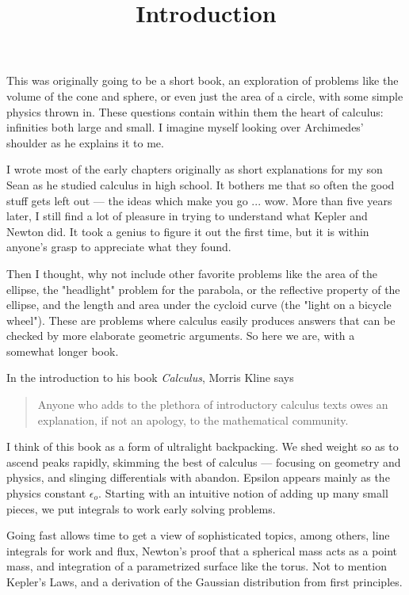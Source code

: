 \documentclass[11pt, oneside]{article}
\title{Introduction}
\date{}
\begin{document}
\maketitle
\Large
This was originally going to be a short book, an exploration of problems like the volume of the cone and sphere, or even just the area of a circle, with some simple physics thrown in.  These questions contain within them the heart of calculus:  infinities both large and small.  I imagine myself looking over Archimedes' shoulder as he explains it to me.

I wrote most of the early chapters originally as short explanations for my son Sean as he studied calculus in high school.  It bothers me that so often the good stuff gets left out --- the ideas which make you go ... wow.  More than five years later, I still find a lot of pleasure in trying to understand what Kepler and Newton did.  It took a genius to figure it out the first time, but it is within anyone's grasp to appreciate what they found.

Then I thought, why not include other favorite problems like the area of the ellipse, the "headlight" problem for the parabola, or the reflective property of the ellipse, and the length and area under the cycloid curve (the "light on a bicycle wheel"). These are problems where calculus easily produces answers that can be checked by more elaborate geometric arguments.  So here we are, with a somewhat longer book.

In the introduction to his book \emph{Calculus}, Morris Kline says
\begin{quote}Anyone who adds to the plethora of introductory calculus texts owes an explanation, if not an apology, to the mathematical community.\end{quote}

I think of this book as a form of ultralight backpacking.  We shed weight so as to ascend peaks rapidly, skimming the best of calculus --- focusing on geometry and physics, and slinging differentials with abandon.  Epsilon appears mainly as the physics constant $\epsilon_o$.  Starting with an intuitive notion of adding up many small pieces, we put integrals to work early solving problems.

Going fast allows time to get a view of sophisticated topics, among others, line integrals for work and flux, Newton's proof that a spherical mass acts as a point mass, and integration of a parametrized surface like the torus.  Not to mention Kepler's Laws, and a derivation of the Gaussian distribution from first principles.
\end{document}
